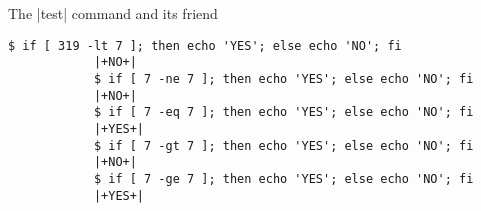 \begin{frame}[fragile]{The \bash|test| command and its friend \bash{[}}
\begin{onlyenv}
        \begin{lstlisting}[style=MyBash, style=oddnumbers, xleftmargin=8mm, xrightmargin=8mm, aboveskip=2mm]
            $ if [ 319 -lt 7 ]; then echo 'YES'; else echo 'NO'; fi
            |+NO+|
            $ if [ 7 -ne 7 ]; then echo 'YES'; else echo 'NO'; fi
            |+NO+|
            $ if [ 7 -eq 7 ]; then echo 'YES'; else echo 'NO'; fi
            |+YES+|
            $ if [ 7 -gt 7 ]; then echo 'YES'; else echo 'NO'; fi
            |+NO+|
            $ if [ 7 -ge 7 ]; then echo 'YES'; else echo 'NO'; fi
            |+YES+|
        \end{lstlisting}
    \end{onlyenv}
    \PrepareURLsymbol[PB]
\end{frame}
